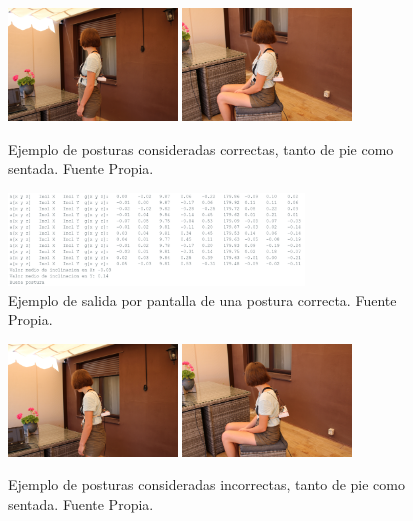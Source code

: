 \begin{figure}[h!]
    \centering
    \includegraphics[width=0.4\textwidth]{img/V2_PosCor_P.jpg}
    \includegraphics[width=0.4\textwidth]{img/V2_PosCor_S.jpg}
    \caption{Ejemplo de posturas consideradas correctas, tanto de pie como sentada. Fuente Propia.}
    \label{fig:imgV2_posturaCorr} 
\end{figure}

\begin{figure}[h!]
    \centering
    \includegraphics[width=0.7\textwidth]{img/PantallaPosturaCorr.png}
    \caption{Ejemplo de salida por pantalla de una postura correcta. Fuente Propia.}
    \label{fig:imgV2_posturaCorr_Pantalla} 
\end{figure}


\begin{figure}[h!]
    \centering
    \includegraphics[width=0.4\textwidth]{img/V2_PosInc_P.jpg}
    \includegraphics[width=0.4\textwidth]{img/V2_PosInc_S.jpg}
    \caption{Ejemplo de posturas consideradas incorrectas, tanto de pie como sentada. Fuente Propia.}
    \label{fig:imgV2_posturaInc} 
\end{figure}

